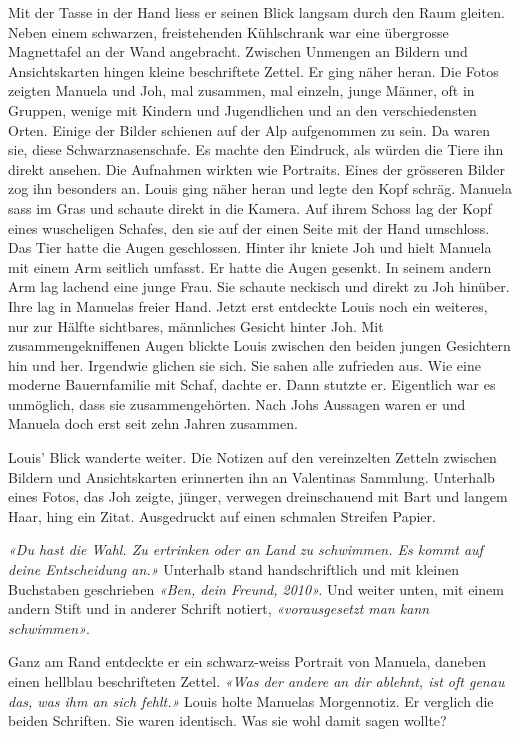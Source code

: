 Mit der Tasse in der Hand liess er seinen Blick langsam durch den Raum gleiten. Neben
einem schwarzen, freistehenden Kühlschrank war eine übergrosse
Magnettafel an der Wand angebracht. Zwischen Unmengen an Bildern und
Ansichtskarten hingen kleine beschriftete Zettel. Er ging näher heran. Die Fotos zeigten Manuela und Joh, mal zusammen, mal einzeln, junge
Männer, oft in Gruppen, wenige mit Kindern und Jugendlichen und
an den verschiedensten Orten. Einige der Bilder schienen auf der Alp
aufgenommen zu sein. Da waren sie, diese Schwarznasenschafe. Es machte
den Eindruck, als würden die Tiere ihn direkt ansehen. Die Aufnahmen  
wirkten wie Portraits. 
Eines der grösseren Bilder zog ihn besonders an. Louis ging näher
heran und legte den Kopf schräg. Manuela sass im Gras und schaute direkt
in die Kamera. Auf ihrem Schoss lag der Kopf eines
wuscheligen Schafes, den sie auf der einen Seite mit der Hand 
umschloss. Das Tier hatte die Augen geschlossen. Hinter
ihr kniete Joh und hielt Manuela mit einem Arm seitlich umfasst. Er
hatte die Augen gesenkt. In seinem andern Arm lag lachend eine junge
Frau. Sie schaute neckisch und direkt zu Joh hinüber. Ihre lag in
Manuelas freier Hand. Jetzt erst entdeckte Louis noch ein weiteres, nur
zur Hälfte sichtbares, männliches Gesicht hinter Joh. Mit
zusammengekniffenen Augen blickte Louis zwischen den beiden jungen
Gesichtern hin und her. Irgendwie glichen sie sich.
Sie sahen alle zufrieden aus. Wie eine moderne Bauernfamilie mit Schaf, dachte er. Dann stutzte er. Eigentlich war es unmöglich, dass sie zusammengehörten. Nach Johs Aussagen waren er und
Manuela doch erst seit zehn Jahren zusammen.

Louis’ Blick wanderte weiter. Die Notizen auf den vereinzelten Zetteln
zwischen Bildern und Ansichtskarten erinnerten ihn an Valentinas
Sammlung. Unterhalb eines Fotos, das Joh zeigte, jünger, verwegen
dreinschauend mit Bart und langem Haar, hing ein Zitat. Ausgedruckt auf
einen schmalen Streifen Papier.

\emph{«Du hast die Wahl. Zu ertrinken oder an Land zu schwimmen. Es
kommt auf deine Entscheidung an.»} Unterhalb stand
handschriftlich und mit kleinen Buchstaben geschrieben \emph{«Ben, dein
Freund, 2010».} Und weiter unten, mit einem andern Stift und in anderer
Schrift notiert, \emph{«vorausgesetzt man kann schwimmen»}. 

Ganz am Rand entdeckte er ein schwarz-weiss Portrait von Manuela, daneben einen hellblau beschrifteten Zettel. 
\emph{«Was der andere an dir ablehnt, ist oft genau das, was ihm an sich fehlt.»}  Louis holte Manuelas Morgennotiz. Er verglich die beiden Schriften. Sie waren identisch. Was sie wohl damit sagen wollte? 

